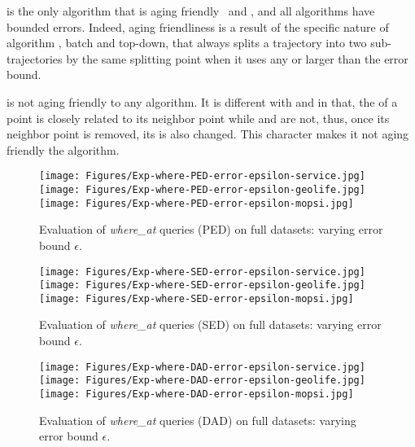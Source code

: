 { \dpa is the only algorithm that is aging friendly \wrt ~\ped and \sed, {and all algorithms have bounded errors}. Indeed, {aging friendliness} is a result of the {specific nature} of algorithm \dpa, \ie batch and top-down, that always splits a trajectory into two sub-trajectories by the same splitting point when it uses any \ped or \sed larger than the error bound.

 \dad is not aging friendly \wrt to any algorithm. It is different with \ped and \sed in that, the \dad of a point is closely related to its neighbor point while \ped and \sed are not, thus, once its neighbor point is removed, its \dad is also changed. This character makes it not aging friendly \wrt the \dpa algorithm.



 	 	
 	 	

\begin{figure*}[tb!]
	\centering
	\texttt{[image: Figures/Exp-where-PED-error-epsilon-service.jpg]}\hspace{0.5ex}
	\texttt{[image: Figures/Exp-where-PED-error-epsilon-geolife.jpg]}\hspace{0.5ex}
	\texttt{[image: Figures/Exp-where-PED-error-epsilon-mopsi.jpg]}
	\vspace{-2ex}
	\caption{\small Evaluation of {\emph{where\_at}} queries (PED) on full datasets: varying error bound $\epsilon$.}
	\label{fig:query-ped-epsilon}
	\vspace{-1.0ex}
\end{figure*}
\begin{figure*}[tb!]
	\centering
	\texttt{[image: Figures/Exp-where-SED-error-epsilon-service.jpg]}\hspace{0.5ex}
	\texttt{[image: Figures/Exp-where-SED-error-epsilon-geolife.jpg]}\hspace{0.5ex}
	\texttt{[image: Figures/Exp-where-SED-error-epsilon-mopsi.jpg]}
	\vspace{-2ex}
	\caption{\small Evaluation of {\emph{where\_at}} queries (SED) on full datasets: varying error bound $\epsilon$.}
	\label{fig:query-sed-epsilon}
	\vspace{-1.0ex}
\end{figure*}
\begin{figure*}[tb!]
	\centering
	\texttt{[image: Figures/Exp-where-DAD-error-epsilon-service.jpg]}\hspace{0.5ex}
	\texttt{[image: Figures/Exp-where-DAD-error-epsilon-geolife.jpg]}\hspace{0.5ex}
	\texttt{[image: Figures/Exp-where-DAD-error-epsilon-mopsi.jpg]}
	\vspace{-2ex}
	\caption{\small Evaluation of {\emph{where\_at}} queries (DAD) on full datasets: varying error bound $\epsilon$.}
	\label{fig:query-dad-epsilon}
	\vspace{-1.0ex}
\end{figure*}


}
